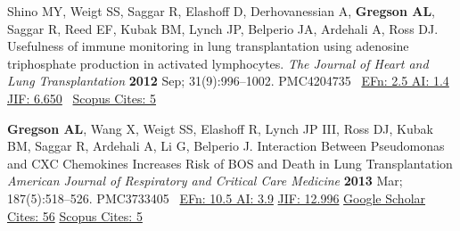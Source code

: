 \documentclass[letterpaper,10pt,sans,dvipsnames,final]{moderncv}%
\begin{document}
\begin{thebibliography}{1}
  \bibitem[20]{} Shino MY, Weigt SS, Saggar R, Elashoff D, Derhovanessian A, \textbf{Gregson AL}, Saggar R, Reed EF, Kubak BM, Lynch JP, Belperio JA, Ardehali A, Ross DJ. Usefulness of immune monitoring in lung transplantation using adenosine triphosphate production in activated lymphocytes. {\color{BrickRed}\textit{The Journal of Heart and Lung Transplantation}} \textbf{2012} Sep; 31(9):996--1002. \href{http://dx.doi.org/10.1016/j.healun.2012.05.012}{\aiDoi} {\smaller PMC4204735}~
    {\color{NavyBlue} \href{http://www.eigenfactor.org/rankings.php?search=JOURNAL+OF+HEART+AND+LUNG+TRANSPLANTATION&search2=&search3=&searchby=journal}{{\smaller EFn: 2.5 AI: 1.4}}
       \href{http://admin-apps.webofknowledge.com/JCR/JCR?RQ=RECORD&rank=1&journal=J+HEART+LUNG+TRANSPL}{{\smaller JIF: 6.650}}~
       \href{http://www.scopus.com/record/display.url?eid=2-s2.0-84864952249&origin=resultslist&sort=plf-f&src=s&st1=gregson&st2=A&nlo=1&nlr=20&nls=count-f&sid=AFE4F9BA8F397BEA10A9EE5867F44C46.ZmAySxCHIBxxTXbnsoe5w%3a133&sot=anl&sdt=aut&sl=36&s=AU-ID%28%22Gregson%2c+Aric+L.%22+6603096521%29&relpos=3&relpos=3&citeCnt=3&searchTerm=AU-ID%28%5C%26quot%3BGregson%2C+Aric+L.%5C%26quot%3B+6603096521%29}{{\smaller Scopus Cites: 5}}
    }


  \bibitem[21]{} \textbf{Gregson AL}, Wang X, Weigt SS, Elashoff R, Lynch JP III, Ross DJ, Kubak BM, Saggar R, Ardehali A, Li G, Belperio J. Interaction Between Pseudomonas and CXC Chemokines Increases Risk of {\smaller BOS} and Death in Lung Transplantation {\color{BrickRed}\textit{American Journal of Respiratory and Critical Care Medicine}} \textbf{2013} Mar; 187(5):518--526. \href{http://dx.doi.org/10.1164/rccm.201207-1228OC}{\aiDoi} {\smaller PMC3733405}~
    {\color{NavyBlue}\href{http://www.eigenfactor.org/rankings.php?bsearch=AMERICAN+JOURNAL+OF+RESPIRATORY+AND+CRITICAL+CARE+MEDICINE&searchby=journal&orderby=eigenfactor}{{\smaller EFn: 10.5  AI: 3.9}}
      \href{http://admin-apps.webofknowledge.com/JCR/JCR?RQ=RECORD&rank=1&journal=AM+J+RESP+CRIT+CARE}{{\smaller JIF: 12.996}}
      \href{https://scholar.google.com/scholar?cites=6087044169539288493&as_sdt=2005&sciodt=0,5&hl=en}{{\smaller Google Scholar Cites: 56}}
      \href{http://www.scopus.com/record/display.uri?eid=2-s2.0-84875164229&origin=resultslist&sort=plf-f&src=s&st1=&st2=&nlo=1&nlr=20&nls=&sid=4E3F003C86CD3B740CA1877B02032D8B.y7ESLndDIsN8cE7qwvy6w%3a2832&sot=anl&sdt=aut&sl=36&s=AU-ID%28%22Gregson%2c+Aric+L.%22+6603096521%29&relpos=7&citeCnt=5&searchTerm=AU-ID%28%5C%26quot%3BGregson%2C+Aric+L.%5C%26quot%3B+6603096521%29}{{\smaller Scopus Cites: 5}}
    }



\end{thebibliography}
\end{document}
